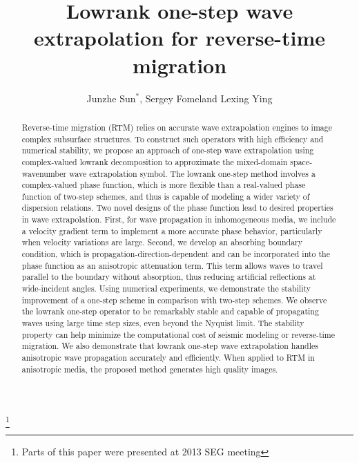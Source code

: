

\title{Lowrank one-step wave extrapolation for reverse-time migration}
\author{Junzhe Sun$^*$\footnotemark[1], Sergey Fomel\footnotemark[1] and Lexing Ying\footnotemark[2]}
\maketitle

\address{
\footnotemark[1]Bureau of Economic Geology \\
John A. and Katherine G. Jackson School of Geosciences \\
The University of Texas at Austin \\
University Station, Box X \\
Austin, TX 78713-8924 \\
\footnotemark[2]Department of Mathematics \\
450 Serra Mall, Bldg 380 \\
Stanford University \\
Stanford, CA 94305-2125
}

\footnote{Parts of this paper were presented at 2013 SEG meeting}


\begin{abstract}
Reverse-time migration (RTM) relies on accurate wave extrapolation engines to image complex subsurface structures. To construct such operators with high efficiency and numerical stability, we propose an approach of one-step wave extrapolation using complex-valued lowrank decomposition to approximate the mixed-domain space-wavenumber wave extrapolation symbol. The lowrank one-step method involves a complex-valued phase function, which is more flexible than a real-valued phase function of two-step schemes, and thus is capable of modeling a wider variety of dispersion relations. Two novel designs of the phase function lead to desired properties in wave extrapolation. First, for wave propagation in inhomogeneous media, we include a velocity gradient term to implement a more accurate phase behavior, particularly when velocity variations are large. Second, we develop an absorbing boundary condition, which is propagation-direction-dependent and can be incorporated into the phase function as an anisotropic attenuation term. This term allows waves to travel parallel to the boundary without absorption, thus reducing artificial reflections at wide-incident angles. Using numerical experiments, we demonstrate the stability improvement of a one-step scheme in comparison with two-step schemes. We observe the lowrank one-step operator to be remarkably stable and capable of propagating waves using large time step sizes, even beyond the Nyquist limit. The stability property can help minimize the computational cost of seismic modeling or reverse-time migration. We also demonstrate that lowrank one-step wave extrapolation handles anisotropic wave propagation accurately and efficiently. When applied to RTM in anisotropic media, the proposed method generates high quality images.
\end{abstract}

